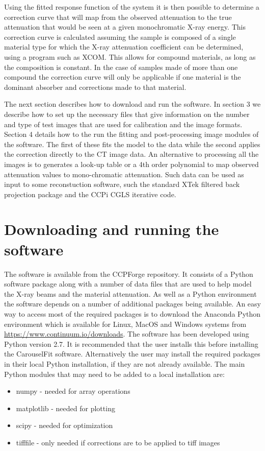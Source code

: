 \documentclass[a4paper,12pt]{article}
\begin{document}
Using the fitted response function of the system it is then possible to determine a correction curve
that will map from the observed attenuation to the true attenuation that would be seen at a given
monochromatic X-ray energy.
This correction curve is calculated assuming the sample is composed of a single material type
for which the X-ray attenuation coefficient can be determined, using a program such as XCOM\cite{xcom}.
This allows for compound materials, as long as the composition is constant.
In the case of samples made of more than one compound the correction curve will only be applicable
if one material is the dominant absorber and corrections made to that material.

The next section describes how to download and run the software.
In section 3 we describe how to set up the necessary files that give
information on the number and type of test images that are used for calibration and the
image formats.
Section 4 details how to the run the fitting and post-processing image modules of the software.
The first of these fits the model to the data while the second applies the correction
directly to the CT image data.
An alternative to processing all the images is to generates a look-up table or a 4th order polynomial
to map observed attenuation values to mono-chromatic attenuation.
Such data can be used as input to some reconstuction software, such the standard XTek filtered back
projection package and the CCPi CGLS iterative code.

\section{Downloading and running the software}

The software is available from the CCPForge repository.
It consists of a Python software package along with a number of data files that are used to help model the X-ray
beams and the material attenuation.
As well as a Python environment the software depends on a number of additional packages being available.
An easy way to access most of the required packages is to download the Anaconda Python environment which is
available for Linux, MacOS and Windows systems from \url{https://www.continuum.io/downloads}.
The software has been developed using Python version 2.7.
It is recommended that the user installs this before installing the CarouselFit software.
Alternatively the user may install the required packages in their local Python installation, if they are not
already available.
The main Python modules that may need to be added to a local installation are:
\begin{itemize}
\item numpy - needed for array operations
\item matplotlib - needed for plotting
\item scipy - needed for optimization
\item tifffile - only needed if corrections are to be applied to tiff images
\end{itemize}
\end{document}
